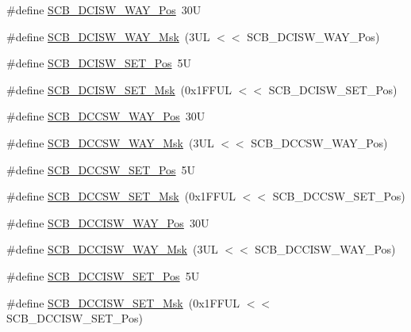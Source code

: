 \begin{DoxyCompactItemize}
\item 
\#define \mbox{\hyperlink{group___c_m_s_i_s___s_c_b_gaa6a2a5e1707c9ef277e67dacd4e247fd}{S\+C\+B\+\_\+\+D\+C\+I\+S\+W\+\_\+\+W\+A\+Y\+\_\+\+Pos}}~30U
\item 
\#define \mbox{\hyperlink{group___c_m_s_i_s___s_c_b_gabfe6096a36807e0b7e1d09a06ef1d750}{S\+C\+B\+\_\+\+D\+C\+I\+S\+W\+\_\+\+W\+A\+Y\+\_\+\+Msk}}~(3\+U\+L $<$$<$ S\+C\+B\+\_\+\+D\+C\+I\+S\+W\+\_\+\+W\+A\+Y\+\_\+\+Pos)
\item 
\#define \mbox{\hyperlink{group___c_m_s_i_s___s_c_b_gaea6bd5b7d1c47c7db06afdecc6e49281}{S\+C\+B\+\_\+\+D\+C\+I\+S\+W\+\_\+\+S\+E\+T\+\_\+\+Pos}}~5U
\item 
\#define \mbox{\hyperlink{group___c_m_s_i_s___s_c_b_gab08fbef94f7d068a7c0217e074c697f9}{S\+C\+B\+\_\+\+D\+C\+I\+S\+W\+\_\+\+S\+E\+T\+\_\+\+Msk}}~(0x1\+F\+F\+U\+L $<$$<$ S\+C\+B\+\_\+\+D\+C\+I\+S\+W\+\_\+\+S\+E\+T\+\_\+\+Pos)
\item 
\#define \mbox{\hyperlink{group___c_m_s_i_s___s_c_b_ga6cac2d69791e13af276d8306c796925f}{S\+C\+B\+\_\+\+D\+C\+C\+S\+W\+\_\+\+W\+A\+Y\+\_\+\+Pos}}~30U
\item 
\#define \mbox{\hyperlink{group___c_m_s_i_s___s_c_b_ga8374e67655ac524284c9bb59eb2efa23}{S\+C\+B\+\_\+\+D\+C\+C\+S\+W\+\_\+\+W\+A\+Y\+\_\+\+Msk}}~(3\+U\+L $<$$<$ S\+C\+B\+\_\+\+D\+C\+C\+S\+W\+\_\+\+W\+A\+Y\+\_\+\+Pos)
\item 
\#define \mbox{\hyperlink{group___c_m_s_i_s___s_c_b_gae93985adc38a127bc8dc909ac58e8fea}{S\+C\+B\+\_\+\+D\+C\+C\+S\+W\+\_\+\+S\+E\+T\+\_\+\+Pos}}~5U
\item 
\#define \mbox{\hyperlink{group___c_m_s_i_s___s_c_b_ga669e16d98c8ea0e66afb04641971d98c}{S\+C\+B\+\_\+\+D\+C\+C\+S\+W\+\_\+\+S\+E\+T\+\_\+\+Msk}}~(0x1\+F\+F\+U\+L $<$$<$ S\+C\+B\+\_\+\+D\+C\+C\+S\+W\+\_\+\+S\+E\+T\+\_\+\+Pos)
\item 
\#define \mbox{\hyperlink{group___c_m_s_i_s___s_c_b_gaa90bd0b36679219d6a2144eba6eb96cd}{S\+C\+B\+\_\+\+D\+C\+C\+I\+S\+W\+\_\+\+W\+A\+Y\+\_\+\+Pos}}~30U
\item 
\#define \mbox{\hyperlink{group___c_m_s_i_s___s_c_b_gaf2269bbe0bc7705e1da8f5ee0f581054}{S\+C\+B\+\_\+\+D\+C\+C\+I\+S\+W\+\_\+\+W\+A\+Y\+\_\+\+Msk}}~(3\+U\+L $<$$<$ S\+C\+B\+\_\+\+D\+C\+C\+I\+S\+W\+\_\+\+W\+A\+Y\+\_\+\+Pos)
\item 
\#define \mbox{\hyperlink{group___c_m_s_i_s___s_c_b_ga525f1bb9849e89b3eafbd53dcd51e296}{S\+C\+B\+\_\+\+D\+C\+C\+I\+S\+W\+\_\+\+S\+E\+T\+\_\+\+Pos}}~5U
\item 
\#define \mbox{\hyperlink{group___c_m_s_i_s___s_c_b_gaf1b0bea5ab77d4ad7d5c21e77ca463ad}{S\+C\+B\+\_\+\+D\+C\+C\+I\+S\+W\+\_\+\+S\+E\+T\+\_\+\+Msk}}~(0x1\+F\+F\+U\+L $<$$<$ S\+C\+B\+\_\+\+D\+C\+C\+I\+S\+W\+\_\+\+S\+E\+T\+\_\+\+Pos)

\end{DoxyCompactItemize}
